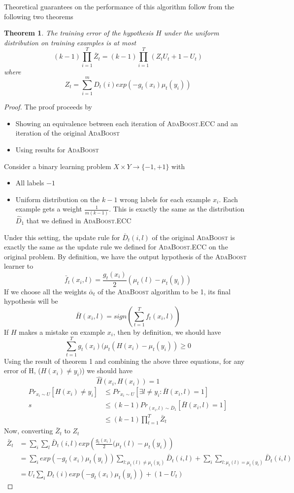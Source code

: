 \documentclass[11pt]{article}
\newtheorem{theorem}{Theorem}
\begin{document}
Theoretical guarantees on the performance of this algorithm follow from the following two theorems
\begin{theorem}
The training error of the hypothesis $H$ under the uniform distribution on training examples is at most $$(k-1)\prod_{i=1}^T \bar Z_t = (k-1)\prod_{i=1}^T (Z_t U_t + 1-U_t)$$ where $$Z_t = \sum_{i=1}^m D_t(i) exp(-g_t(x_i)\mu_t(y_i))$$
\end{theorem}
\begin{proof}
The proof proceeds by 
\begin{itemize}
\item Showing an equivalence between each iteration of \textsc{AdaBoost}.ECC and an iteration of the original \textsc{AdaBoost}
\item Using results for \textsc{AdaBoost}
\end{itemize}
Consider a binary learning problem $X \times Y \rightarrow \{-1,+1\}$ with
\begin{itemize}
\item All labels $-1$
\item Uniform distribution on the $k-1$ wrong labels for each example $x_i$. Each example gets a weight $\frac{1}{m(k-1)}$. This is exactly the same as the distribution $\hat D_1$ that we defined in \textsc{AdaBoost}.ECC
\end{itemize}

Under this setting, the update rule for $\bar D_t(i,l)$ of the original \textsc{AdaBoost} is exactly the same as the update rule we defined for \textsc{AdaBoost}.ECC on the original problem. By definition, we have the output hypothesis of the \textsc{AdaBoost} learner to
$$\bar f_t(x_i,l) = \frac{g_t(x_i)}{2}(\mu_t(l) - \mu_t(y_i))$$
If we choose all the weights $\bar \alpha_t$ of the \textsc{AdaBoost} algorithm to be 1, its final hypothesis will be 
$$\bar H(x_i,l) = sign(\sum_{t=1}^T f_t(x_i, l)) $$
If $H$ makes a mistake on example $x_i$, then by definition, we should have 
$$\sum_{t=1}^T g_t(x_i)(\mu_t(H(x_i) - \mu_t(y_i)) \ge 0$$
Using the result of theorem 1 and combining the above three equations, for any error of H, ($H(x_i) \neq y_i)$) we should have $$\hat H(x_i, H(x_i)) = 1$$
\begin{align*}
Pr_{x_i \sim U}[H(x_i) \neq y_i] &\le  Pr_{x_i \sim U}[\exists l \neq y_i : \bar H(x_i, l) = 1]\\s
&\le (k-1) Pr_{(x_i, l) \sim \bar D_1} [\bar H(x_i, l) = 1]\\
&\le (k-1) \prod_{t=1}^T \bar Z_t
\end{align*}
Now, converting $\bar Z_t$ to $Z_t$
\begin{align*}
\bar Z_t &= \sum_i \sum_l \bar D_t(i,l) exp\left(\frac{g_t(x_i)}{2}(\mu_t(l)-\mu_t(y_i)\right)\\
&= \sum_i exp(-g_t(x_i)\mu_t(y_i)) \sum_{l: \mu_t(l) \neq \mu_t(y_i)} \bar D_t(i,l) + \sum_i \sum_{l: \mu_t(l) = \mu_t(y_i)} \bar D_t(i,l)\\
&= U_t \sum_i D_t(i) exp(-g_t(x_i) \mu_t(y_i)) + (1-U_t)
\end{align*}
\end{proof}
\end{document}
